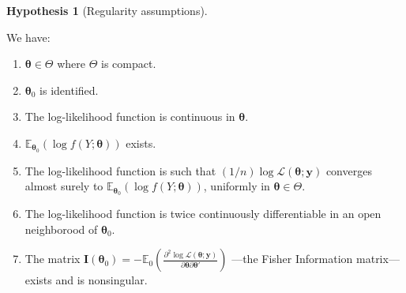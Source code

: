 \documentclass[
  12pt,
]{book}
\providecommand{\tightlist}{%
  \setlength{\itemsep}{0pt}\setlength{\parskip}{0pt}}
\theoremstyle{definition}
\theoremstyle{definition}
\theoremstyle{definition}
\theoremstyle{definition}
\newtheorem{hypothesis}{Hypothesis}[chapter]
\theoremstyle{remark}
\begin{document}
\begin{hypothesis}[Regularity assumptions]
\protect\hypertarget{hyp:MLEregularity}{}\label{hyp:MLEregularity}

We have:

\begin{enumerate}
\def\labelenumi{\roman{enumi}.}
\tightlist
\item
  \(\boldsymbol\theta \in \Theta\) where \(\Theta\) is compact.
\item
  \(\boldsymbol\theta_0\) is identified.
\item
  The log-likelihood function is continuous in \(\boldsymbol\theta\).
\item
  \(\mathbb{E}_{\boldsymbol\theta_0}(\log f(Y;\boldsymbol\theta))\) exists.
\item
  The log-likelihood function is such that \((1/n)\log\mathcal{L}(\boldsymbol\theta;\mathbf{y})\) converges almost surely to \(\mathbb{E}_{\boldsymbol\theta_0}(\log f(Y;\boldsymbol\theta))\), uniformly in \(\boldsymbol\theta \in \Theta\).
\item
  The log-likelihood function is twice continuously differentiable in an open neighborood of \(\boldsymbol\theta_0\).
\item
  The matrix \(\mathbf{I}(\boldsymbol\theta_0) = - \mathbb{E}_0 \left( \frac{\partial^2 \log \mathcal{L}(\boldsymbol\theta;\mathbf{y})}{\partial \boldsymbol\theta \partial \boldsymbol\theta'}\right)\) ---the Fisher Information matrix--- exists and is nonsingular.
\end{enumerate}

\end{hypothesis}
\end{document}
